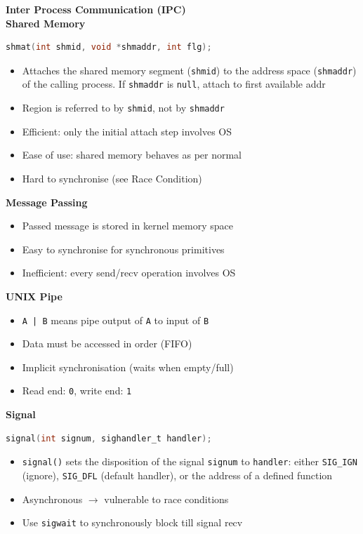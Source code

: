 \documentclass[a4paper, 12pt]{article}
\begin{document}
\begin{multicols*}{4}
{\small\textbf{Inter Process Communication (IPC)}} \\
\textbf{Shared Memory}
\begin{lstlisting}[language=C]
shmat(int shmid, void *shmaddr, int flg);
\end{lstlisting}
\begin{itemize}
	\item Attaches the shared memory segment (\texttt{shmid}) to the address space (\texttt{shmaddr}) of the calling process. If \texttt{shmaddr} is \texttt{null}, attach to first available addr
	\item Region is referred to by \texttt{shmid}, not by \texttt{shmaddr}
	\item Efficient: only the initial attach step involves OS
	\item Ease of use: shared memory behaves as per normal
	\item Hard to synchronise (see Race Condition)
\end{itemize}
\textbf{Message Passing}
\begin{itemize}
	\item Passed message is stored in kernel memory space
	\item Easy to synchronise for synchronous primitives
	\item Inefficient: every send/recv operation involves OS
\end{itemize}
\textbf{UNIX Pipe}
\begin{itemize}
	\item \texttt{A | B} means pipe output of \texttt{A} to input of \texttt{B}
	\item Data must be accessed in order (FIFO)
	\item Implicit synchronisation (waits when empty/full)
	\item Read end: \texttt{0}, write end: \texttt{1}
\end{itemize}
\textbf{Signal}
\begin{lstlisting}[language=C]
signal(int signum, sighandler_t handler);
\end{lstlisting}
\begin{itemize}
	\item \texttt{signal()} sets the disposition of the signal \texttt{signum} to \texttt{handler}: either \texttt{SIG\_IGN} (ignore), \texttt{SIG\_DFL} (default handler), or the address of a defined function
	\item Asynchronous $\rightarrow$ vulnerable to race conditions
	\item Use \texttt{sigwait} to synchronously block till signal recv
\end{itemize}


\end{multicols*}
\end{document}
